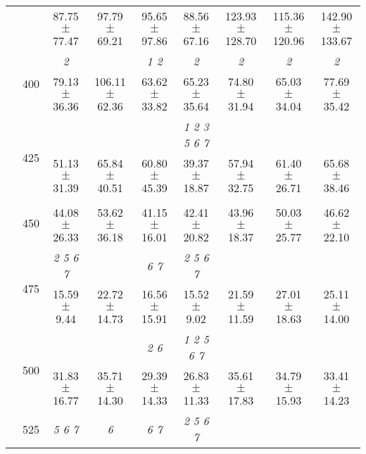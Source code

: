 \begin{table}[h]
{\begin{tabular}{
        ccccccccc}
 & & \cellcolor[HTML]{EFEFEF} 87.75 $\pm$ 77.47& \cellcolor[HTML]{EFEFEF} 97.79 $\pm$ 69.21& \cellcolor[HTML]{EFEFEF} 95.65 $\pm$ 97.86& \cellcolor[HTML]{EFEFEF} 88.56 $\pm$ 67.16& \cellcolor[HTML]{EFEFEF} 123.93 $\pm$ 128.70& \cellcolor[HTML]{EFEFEF} 115.36 $\pm$ 120.96& \cellcolor[HTML]{EFEFEF} 142.90 $\pm$ 133.67 \\ 
 & \multirow{2}{*}{400}& \textit{ 2 }& & \textit{ 1 2 }& \textit{ 2 }& \textit{ 2 }& \textit{ 2 }& \textit{ 2 } \\ 
 & & 79.13 $\pm$ 36.36& 106.11 $\pm$ 62.36& 63.62 $\pm$ 33.82& 65.23 $\pm$ 35.64& 74.80 $\pm$ 31.94& 65.03 $\pm$ 34.04& 77.69 $\pm$ 35.42 \\ 
 & \multirow{2}{*}{425}& \cellcolor[HTML]{EFEFEF} & \cellcolor[HTML]{EFEFEF} & \cellcolor[HTML]{EFEFEF} & \cellcolor[HTML]{EFEFEF} \textit{ 1 2 3 5 6 7 }& \cellcolor[HTML]{EFEFEF} & \cellcolor[HTML]{EFEFEF} & \cellcolor[HTML]{EFEFEF}  \\ 
 & & \cellcolor[HTML]{EFEFEF} 51.13 $\pm$ 31.39& \cellcolor[HTML]{EFEFEF} 65.84 $\pm$ 40.51& \cellcolor[HTML]{EFEFEF} 60.80 $\pm$ 45.39& \cellcolor[HTML]{EFEFEF} 39.37 $\pm$ 18.87& \cellcolor[HTML]{EFEFEF} 57.94 $\pm$ 32.75& \cellcolor[HTML]{EFEFEF} 61.40 $\pm$ 26.71& \cellcolor[HTML]{EFEFEF} 65.68 $\pm$ 38.46 \\ 
 & \multirow{2}{*}{450}& & & & & & &  \\ 
 & & 44.08 $\pm$ 26.33& 53.62 $\pm$ 36.18& 41.15 $\pm$ 16.01& 42.41 $\pm$ 20.82& 43.96 $\pm$ 18.37& 50.03 $\pm$ 25.77& 46.62 $\pm$ 22.10 \\ 
 & \multirow{2}{*}{475}& \cellcolor[HTML]{EFEFEF} \textit{ 2 5 6 7 }& \cellcolor[HTML]{EFEFEF} & \cellcolor[HTML]{EFEFEF} \textit{ 6 7 }& \cellcolor[HTML]{EFEFEF} \textit{ 2 5 6 7 }& \cellcolor[HTML]{EFEFEF} & \cellcolor[HTML]{EFEFEF} & \cellcolor[HTML]{EFEFEF}  \\ 
 & & \cellcolor[HTML]{EFEFEF} 15.59 $\pm$ 9.44& \cellcolor[HTML]{EFEFEF} 22.72 $\pm$ 14.73& \cellcolor[HTML]{EFEFEF} 16.56 $\pm$ 15.91& \cellcolor[HTML]{EFEFEF} 15.52 $\pm$ 9.02& \cellcolor[HTML]{EFEFEF} 21.59 $\pm$ 11.59& \cellcolor[HTML]{EFEFEF} 27.01 $\pm$ 18.63& \cellcolor[HTML]{EFEFEF} 25.11 $\pm$ 14.00 \\ 
 & \multirow{2}{*}{500}& & & \textit{ 2 6 }& \textit{ 1 2 5 6 7 }& & &  \\ 
 & & 31.83 $\pm$ 16.77& 35.71 $\pm$ 14.30& 29.39 $\pm$ 14.33& 26.83 $\pm$ 11.33& 35.61 $\pm$ 17.83& 34.79 $\pm$ 15.93& 33.41 $\pm$ 14.23 \\ 
 & \multirow{2}{*}{525}& \cellcolor[HTML]{EFEFEF} \textit{ 5 6 7 }& \cellcolor[HTML]{EFEFEF} \textit{ 6 }& \cellcolor[HTML]{EFEFEF} \textit{ 6 7 }& \cellcolor[HTML]{EFEFEF} \textit{ 2 5 6 7 }& \cellcolor[HTML]{EFEFEF} & \cellcolor[HTML]{EFEFEF} & \cellcolor[HTML]{EFEFEF}  \\ 

\end{tabular}}
\end{table}
